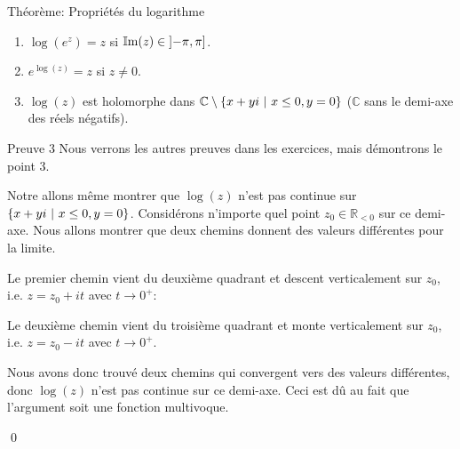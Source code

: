 \documentclass[a4paper]{article}
\begin{document}
\begin{parag}{Théorème: Propriétés du logarithme}
    \begin{enumerate}[left=0pt]
        \item $\log\left(e^z\right) = z$ si $\cim\left(z\right) \in \left]-\pi, \pi\right]$.
        \item $e^{\log\left(z\right)} = z$ si $z \neq 0$.
        \item $\log\left(z\right)$ est holomorphe dans $\mathbb{C} \setminus \left\{x + yi \suchthat x \leq 0, y = 0\right\}$ ($\mathbb{C}$ sans le demi-axe des réels négatifs).
    \end{enumerate}

    \begin{subparag}{Preuve 3}
        Nous verrons les autres preuves dans les exercices, mais démontrons le point 3.

        Notre allons même montrer que $\log\left(z\right)$ n'est pas continue sur $\left\{x + yi \suchthat x \leq 0, y = 0\right\}$. Considérons n'importe quel point $z_0 \in \mathbb{R}_{< 0}$ sur ce demi-axe. Nous allons montrer que deux chemins donnent des valeurs différentes pour la limite. 

        Le premier chemin vient du deuxième quadrant et descent verticalement sur $z_0$, i.e. $z = z_0 + it$ avec $t \to 0^+$: 

        Le deuxième chemin vient du troisième quadrant et monte verticalement sur $z_0$, i.e. $z = z_0 - it$ avec $t \to 0^+$.

        Nous avons donc trouvé deux chemins qui convergent vers des valeurs différentes, donc $\log\left(z\right)$ n'est pas continue sur ce demi-axe. Ceci est dû au fait que l'argument soit une fonction multivoque.

        \qed
    \end{subparag}
\end{parag}
\end{document}
